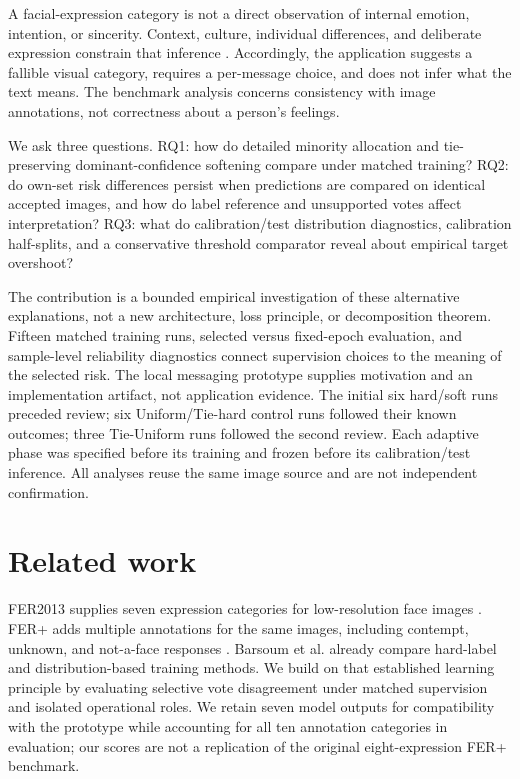 \documentclass[pdflatex,sn-mathphys-num]{sn-jnl}
\begin{document}
A facial-expression category is not a direct observation of internal emotion, intention, or sincerity. Context, culture, individual differences, and deliberate expression constrain that inference \cite{barrett2019emotions}. Accordingly, the application suggests a fallible visual category, requires a per-message choice, and does not infer what the text means. The benchmark analysis concerns consistency with image annotations, not correctness about a person's feelings.

We ask three questions. RQ1: how do detailed minority allocation and tie-preserving dominant-confidence softening compare under matched training? RQ2: do own-set risk differences persist when predictions are compared on identical accepted images, and how do label reference and unsupported votes affect interpretation? RQ3: what do calibration/test distribution diagnostics, calibration half-splits, and a conservative threshold comparator reveal about empirical target overshoot?

The contribution is a bounded empirical investigation of these alternative explanations, not a new architecture, loss principle, or decomposition theorem. Fifteen matched training runs, selected versus fixed-epoch evaluation, and sample-level reliability diagnostics connect supervision choices to the meaning of the selected risk. The local messaging prototype supplies motivation and an implementation artifact, not application evidence. The initial six hard/soft runs preceded review; six Uniform/Tie-hard control runs followed their known outcomes; three Tie-Uniform runs followed the second review. Each adaptive phase was specified before its training and frozen before its calibration/test inference. All analyses reuse the same image source and are not independent confirmation.

\section{Related work}
FER2013 supplies seven expression categories for low-resolution face images \cite{goodfellow2013fer}. FER+ adds multiple annotations for the same images, including contempt, unknown, and not-a-face responses \cite{barsoum2016ferplus}. Barsoum et al. already compare hard-label and distribution-based training methods. We build on that established learning principle by evaluating selective vote disagreement under matched supervision and isolated operational roles. We retain seven model outputs for compatibility with the prototype while accounting for all ten annotation categories in evaluation; our scores are not a replication of the original eight-expression FER+ benchmark.
\end{document}
